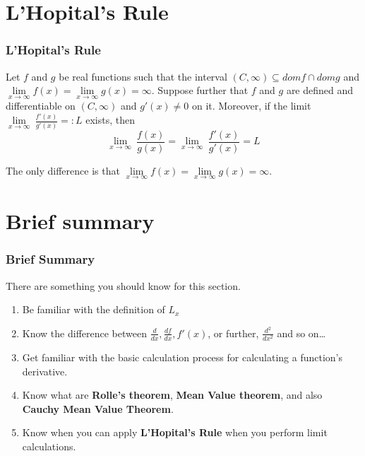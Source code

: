 \documentclass[12pt, t]{beamer}
\begin{document}
\section{L'Hopital's Rule}
\begin{frame}
    \frametitle{L'Hopital's Rule}
    Let $f$ and $g$ be real functions such that the interval $(C,\infty)\subseteq domf\cap domg$ and
    $\underset{x\rightarrow \infty }{\lim}f(x)=\underset{x\rightarrow \infty }{\lim}g(x)=\infty$. Suppose further that $f$ and $g$ are defined
    and differentiable on $(C,\infty)$ and $g'(x)\neq 0$ on it. Moreover, if the limit $\underset{x\rightarrow \infty }{\lim}\ \frac{f'(x)}{g'(x)}=:L$ exists, then
    \begin{equation*}
        \underset{x\rightarrow\infty}{\lim}\ \frac{f(x)}{g(x)}=\underset{x\rightarrow\infty}{\lim}\ \frac{f'(x)}{g'(x)}=L
    \end{equation*}

    \vspace{0.5em}
    \hspace{1em}
    The only difference is that $\underset{x\rightarrow\infty}{\lim}f(x)=\underset{x\rightarrow \infty }{\lim}g(x)=\infty$.
\end{frame}


\section{Brief summary}
\begin{frame}
    \frametitle{Brief Summary}
    There are something you should know for this section.
    \vspace{1em}
    \begin{enumerate}
        \item Be familiar with the definition of $L_x$
              \vspace{0.5em}
        \item Know the difference between $\frac{d}{dx}, \frac{df}{dx},f'(x)$, or further, $\frac{d^2}{dx^2}$ and so on\dots
              \vspace{0.5em}
        \item Get familiar with the basic calculation process for calculating a function's derivative.
              \vspace{0.5em}
        \item Know what are \textbf{Rolle's theorem}, \textbf{Mean Value theorem}, and also \textbf{Cauchy Mean Value Theorem}.
              \vspace{0.5em}
        \item Know when you can apply \textbf{L'Hopital's Rule} when you perform limit calculations.
    \end{enumerate}
\end{frame}
\end{document}
